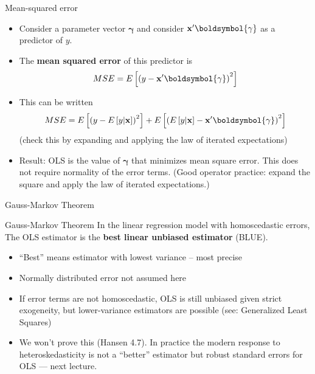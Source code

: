 \documentclass[aspectratio=169,11pt]{beamer}
\begin{document}
\begin{frame}{Mean-squared error}
\begin{itemize}
	\item Consider a parameter vector $\boldsymbol{\gamma}$ and consider
	${\bf x}'\boldsymbol{\gamma}$ as a predictor of $y$. 

	\medskip
	\item The {\bf mean squared error} of this predictor is\[
	MSE = E\left[\left( y - {\bf x}' \boldsymbol{\gamma}\right)^{2}\right]
	\]

	\item This can be written\[
	MSE = E\left[ \left(y - E\left[y | {\bf x}\right]\right)^{2}\right] + E\left[  \left(E\left[y | {\bf x}\right]- {\bf x}' \boldsymbol{\gamma}\right)^{2} \right]
	\]
	(check this by expanding and applying the law of iterated expectations)

	\item Result: OLS is the value of $\boldsymbol{\gamma}$ that minimizes mean square error. This does not
	require normality of the error terms. (Good operator practice: expand the square and apply
	the law of iterated expectations.)

\end{itemize}
\end{frame}


\begin{frame}{Gauss-Markov Theorem}

\begin{block}{Gauss-Markov Theorem}
In the linear regression model with homoscedastic errors, The OLS estimator 
is the {\bf best linear unbiased estimator} (BLUE).
\end{block}

\begin{itemize}
	\item ``Best'' means estimator with lowest variance -- most precise

	\item Normally distributed error not assumed here

	\item If error terms are not homoscedastic, OLS is still unbiased given strict
	exogeneity, but lower-variance estimators are possible (see: Generalized Least Squares)

	\item We won't prove this (Hansen 4.7). In practice the modern response to
	heteroskedasticity is not a ``better'' estimator but \alert{robust standard errors}
	for OLS --- next lecture.

\end{itemize}
\end{frame}
\end{document}
